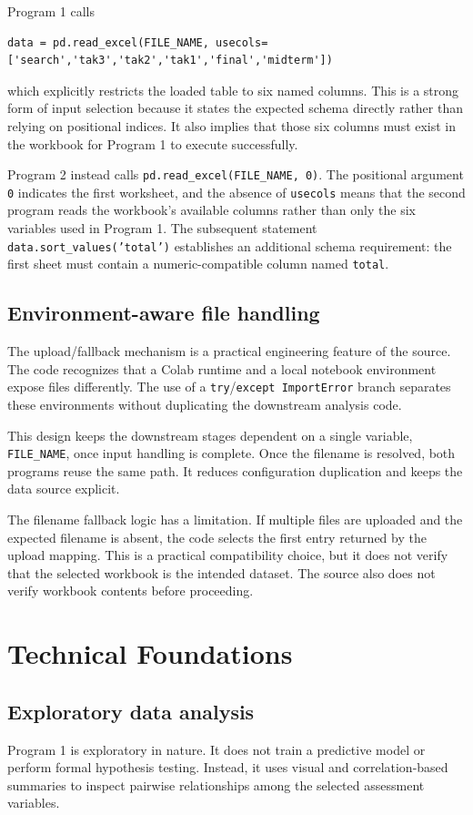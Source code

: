 \documentclass[11pt,a4paper]{article}
\begin{document}
Program 1 calls
\begin{lstlisting}
data = pd.read_excel(FILE_NAME, usecols=['search','tak3','tak2','tak1','final','midterm'])
\end{lstlisting}
which explicitly restricts the loaded table to six named columns. This is a strong form of input selection because it states the expected schema directly rather than relying on positional indices. It also implies that those six columns must exist in the workbook for Program 1 to execute successfully.

Program 2 instead calls \texttt{pd.read\_excel(FILE\_NAME, 0)}. The positional argument \texttt{0} indicates the first worksheet, and the absence of \texttt{usecols} means that the second program reads the workbook's available columns rather than only the six variables used in Program 1. The subsequent statement \texttt{data.sort\_values('total')} establishes an additional schema requirement: the first sheet must contain a numeric-compatible column named \texttt{total}.

\subsection{Environment-aware file handling}
The upload/fallback mechanism is a practical engineering feature of the source. The code recognizes that a Colab runtime and a local notebook environment expose files differently. The use of a \texttt{try}/\texttt{except ImportError} branch separates these environments without duplicating the downstream analysis code.

This design keeps the downstream stages dependent on a single variable, \texttt{FILE\_NAME}, once input handling is complete. Once the filename is resolved, both programs reuse the same path. It reduces configuration duplication and keeps the data source explicit.

The filename fallback logic has a limitation. If multiple files are uploaded and the expected filename is absent, the code selects the first entry returned by the upload mapping. This is a practical compatibility choice, but it does not verify that the selected workbook is the intended dataset. The source also does not verify workbook contents before proceeding.

\section{Technical Foundations}
\subsection{Exploratory data analysis}
Program 1 is exploratory in nature. It does not train a predictive model or perform formal hypothesis testing. Instead, it uses visual and correlation-based summaries to inspect pairwise relationships among the selected assessment variables.
\end{document}
